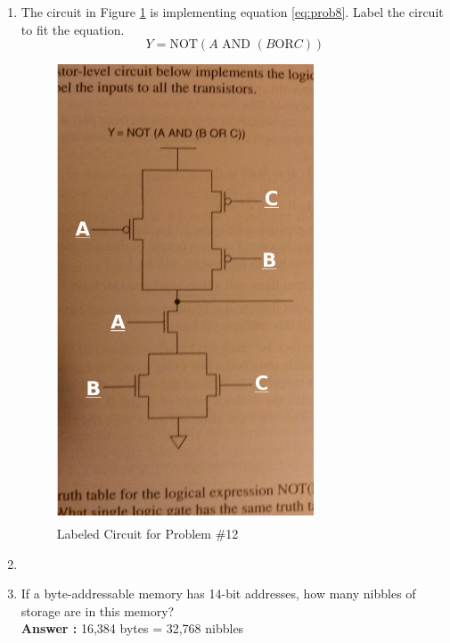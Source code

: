 \documentclass[a4paper,11pt]{article}
\begin{document}
\begin{enumerate}
\item The circuit in Figure \ref{fig:prob8} is implementing equation \eqref{eq:prob8}. Label the circuit to fit the equation.
\begin{equation} \label{eq:prob8} Y = \text{NOT}(A \text{ AND } (B \text{OR} C))
\end{equation}
\begin{figure}[h!]
   \centering
     \includegraphics[width=3in]{prob8}
   \caption{Labeled Circuit for Problem \#12}
   \label{fig:prob8}
\end{figure}  

\item 

\item If a byte-addressable memory has 14-bit addresses, how many nibbles of storage are in this memory? \\
\textbf{Answer :} 16,384 bytes = 32,768 nibbles


\end{enumerate}
\end{document}
